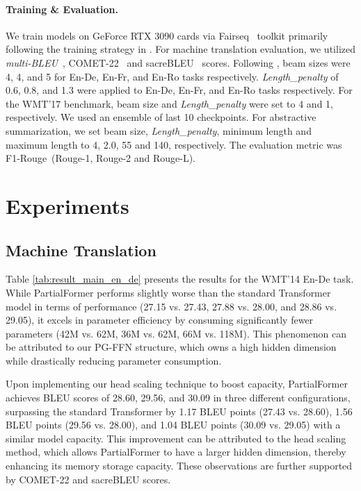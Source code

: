 \documentclass[11pt]{article}
\begin{document}
\paragraph{Training \& Evaluation.}

We train models on GeForce RTX 3090 cards via Fairseq~\cite{ott-etal-2019-fairseq} toolkit primarily following the training strategy in \citet{wang-etal-2019-learning-deep}. For machine translation evaluation, we utilized \textit{multi-BLEU}~\cite{papineni-etal-2002-bleu}, COMET-22~\cite{rei-etal-2022-comet} and sacreBLEU~\cite{post-2018-call} scores. Following \citet{wang-etal-2019-learning-deep}, beam sizes were 4, 4, and 5 for En-De, En-Fr, and En-Ro tasks respectively. \textit{Length\_penalty} of 0.6, 0.8, and 1.3 were applied to En-De, En-Fr, and En-Ro tasks respectively. For the WMT'17 benchmark, beam size and \textit{Length\_penalty} were set to 4 and 1, respectively. We used an ensemble of last 10 checkpoints. For abstractive summarization, we set beam size, \textit{Length\_penalty}, minimum length and maximum length to 4, 2.0, 55 and 140, respectively. The evaluation metric was F1-Rouge~\cite{lin-2004-rouge}(Rouge-1,
Rouge-2 and Rouge-L).




\section{Experiments}
\subsection{Machine Translation}
Table \ref{tab:result_main_en_de} presents the results for the WMT'14 En-De task. While PartialFormer performs slightly worse than the standard Transformer model in terms of performance (27.15 vs. 27.43, 27.88 vs. 28.00, and 28.86 vs. 29.05), it excels in parameter efficiency by consuming significantly fewer parameters (42M vs. 62M, 36M vs. 62M, 66M vs. 118M). This phenomenon can be attributed to our PG-FFN structure, which owns a high hidden dimension while drastically reducing parameter consumption.


Upon implementing our head scaling technique to boost capacity, PartialFormer achieves BLEU scores of 28.60, 29.56, and 30.09 in three different configurations, surpassing the standard Transformer by 1.17 BLEU points (27.43 vs. 28.60), 1.56 BLEU points (29.56 vs. 28.00), and 1.04 BLEU points (30.09 vs. 29.05) with a similar model capacity. This improvement can be attributed to the head scaling method, which allows PartialFormer to have a larger hidden dimension, thereby enhancing its memory storage capacity. These observations are further supported by COMET-22 and sacreBLEU scores.
\end{document}

